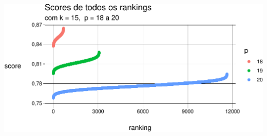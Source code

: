 \documentclass[
  letterpaper,
  DIV=11,
  numbers=noendperiod]{scrreprt}
\begin{document}
\begin{center}
\includegraphics[width=1\textwidth,height=\textheight]{usando-posicoes_files/figure-pdf/unnamed-chunk-8-1.pdf}
\end{center}
\end{document}
